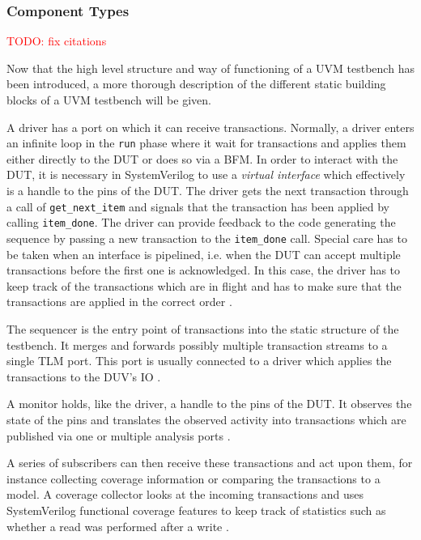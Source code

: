 \documentclass[11pt]{report}
\newcommand{\ttt}{\texttt}
\newcommand{\todo}[1]{\textcolor{red}{TODO: #1}}
\begin{document}
\subsubsection{Component Types} %

\todo{fix citations}

Now that the high level structure and way of functioning of a UVM testbench has been introduced, a more thorough description of the different static building blocks of a UVM testbench will be given.



A driver has a port on which it can receive transactions. Normally, a driver enters an infinite loop in the \ttt{run}
phase where it wait for transactions and applies them either directly to the DUT or does so via a BFM. In order to
interact with the DUT, it is necessary in SystemVerilog to use a \textit{virtual interface} which effectively is a
handle to the pins of the DUT. The driver gets the next transaction through a call of \ttt{get\_next\_item} and
signals that the transaction has been applied by calling \ttt{item\_done}. The driver can provide feedback to the
code generating the sequence by passing a new transaction to the \ttt{item\_done} call. Special care has to be taken
when an interface is pipelined, i.e. when the DUT can accept multiple transactions before the first one is
acknowledged. In this case, the driver has to keep track of the transactions which are in flight and has to make sure
that the transactions are applied in the correct order \cite[ch. 4.7]{mehta2018asic}.

The sequencer is the entry point of transactions into the static structure of the testbench. It merges and forwards possibly multiple transaction streams to a single TLM port. This port is usually connected to a driver which applies the transactions to the DUV's IO \cite[Ch. 23]{salemi2013uvm}.

A monitor holds, like the driver, a handle to the pins of the DUT. It observes the state of the pins and translates
the observed activity into transactions which are published via one or multiple analysis ports \cite{}.

A series of subscribers can then receive these transactions and act upon them, for instance collecting coverage
information or comparing the transactions to a model. A coverage collector looks at the incoming transactions and
uses SystemVerilog functional coverage features to keep track of statistics such as whether a read was performed after a write \cite{}.
\end{document}

